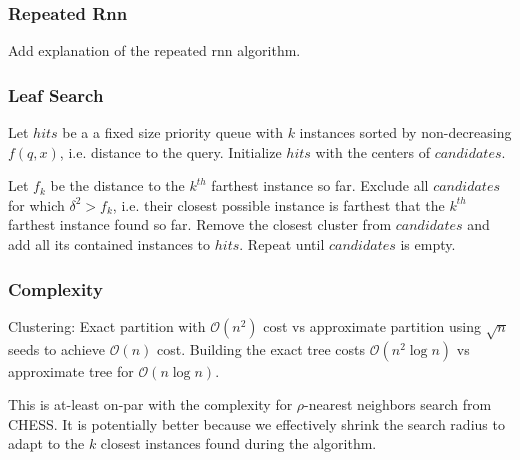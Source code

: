 \subsubsection{Repeated Rnn}
\label{subsubsec:methods:knn-search:repeated-rnn}
Add explanation of the repeated rnn algorithm.

\subsubsection{Leaf Search}
\label{subsubsec:methods:knn-search:leaf-search}

Let $hits$ be a a fixed size priority queue with $k$ instances sorted by non-decreasing $f(q, x)$, i.e. distance to the query.
Initialize $hits$ with the centers of $candidates$.

Let $f_k$ be the distance to the $k^{th}$ farthest instance so far.
Exclude all $candidates$ for which $\delta^2 > f_k$, i.e. their closest possible instance is farthest that the $k^{th}$ farthest instance found so far.
Remove the closest cluster from $candidates$ and add all its contained instances to $hits$.
Repeat until $candidates$ is empty.

\subsubsection{Complexity}
\label{subsubsec:methods:knn-search:complexity}

Clustering: Exact partition with $\mathcal{O}(n^2)$ cost vs approximate partition using $\sqrt{n}$ seeds to achieve $\mathcal{O}(n)$ cost.
Building the exact tree costs $\mathcal{O}(n^2 \log n)$ vs approximate tree for $\mathcal{O}(n \log n)$.

This is at-least on-par with the complexity for $\rho$-nearest neighbors search from CHESS.
It is potentially better because we effectively shrink the search radius to adapt to the $k$ closest instances found during the algorithm.
